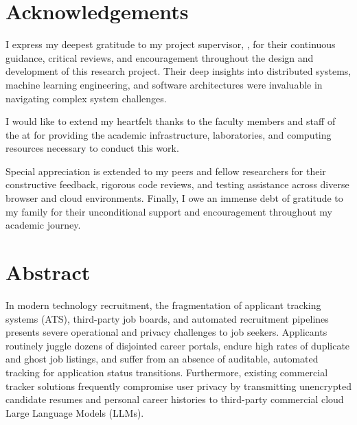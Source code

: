 \newpage
\chapter*{Acknowledgements}
\thispagestyle{plain}

I express my deepest gratitude to my project supervisor, \textbf{\supervisorName}, for their continuous guidance, critical reviews, and encouragement throughout the design and development of this research project. Their deep insights into distributed systems, machine learning engineering, and software architectures were invaluable in navigating complex system challenges.

\vspace{0.5cm}
I would like to extend my heartfelt thanks to the faculty members and staff of the \textbf{\departmentName} at \textbf{\institutionName} for providing the academic infrastructure, laboratories, and computing resources necessary to conduct this work.

\vspace{0.5cm}
Special appreciation is extended to my peers and fellow researchers for their constructive feedback, rigorous code reviews, and testing assistance across diverse browser and cloud environments. Finally, I owe an immense debt of gratitude to my family for their unconditional support and encouragement throughout my academic journey.

\vspace{2cm}
\noindent
\textbf{\studentName}

\newpage
\chapter*{Abstract}
\thispagestyle{plain}

In modern technology recruitment, the fragmentation of applicant tracking systems (ATS), third-party job boards, and automated recruitment pipelines presents severe operational and privacy challenges to job seekers. Applicants routinely juggle dozens of disjointed career portals, endure high rates of duplicate and ghost job listings, and suffer from an absence of auditable, automated tracking for application status transitions. Furthermore, existing commercial tracker solutions frequently compromise user privacy by transmitting unencrypted candidate resumes and personal career histories to third-party commercial cloud Large Language Models (LLMs).

